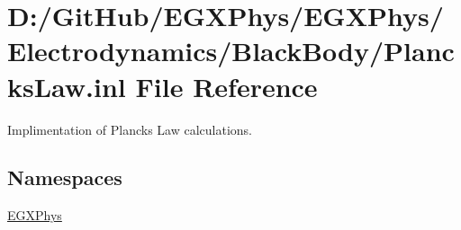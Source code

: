 \hypertarget{_plancks_law_8inl}{}\section{D\+:/\+Git\+Hub/\+E\+G\+X\+Phys/\+E\+G\+X\+Phys/\+Electrodynamics/\+Black\+Body/\+Plancks\+Law.inl File Reference}
\label{_plancks_law_8inl}


Implimentation of Planck\textquotesingle{}s Law calculations.  


\subsection*{Namespaces}
\begin{DoxyCompactItemize}
\item 
 \mbox{\hyperlink{namespace_e_g_x_phys}{E\+G\+X\+Phys}}
\end{DoxyCompactItemize}
